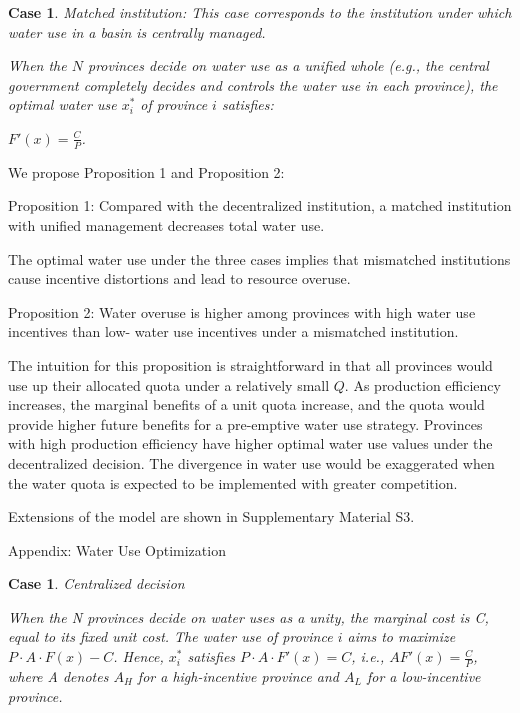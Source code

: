 \documentclass[default, sn-standardnature]{sn-jnl} %
\newtheorem{case}{Case}
\newtheorem{case_appendix}{Case}
\begin{document}
 \begin{case} Matched institution: This case corresponds to the institution under which water use in a basin is centrally managed.

 When the $N$ provinces decide on water use as a unified whole (e.g., the central government completely decides and controls the water use in each province), the optimal water use $x_i^*$ of province $i$ satisfies:

$F'(x)=\frac{C}{P}$.

 \end{case}


We propose Proposition 1 and Proposition 2:

Proposition 1: Compared with the decentralized institution, a matched institution with unified management decreases total water use.

The optimal water use under the three cases implies that mismatched institutions cause incentive distortions and lead to resource overuse.


Proposition 2: Water overuse is higher among provinces with high water use incentives than low- water use incentives under a mismatched institution.

The intuition for this proposition is straightforward in that all provinces would use up their allocated quota under a relatively small $Q$. As production efficiency increases, the marginal benefits of a unit quota increase, and the quota would provide higher future benefits for a pre-emptive water use strategy. Provinces with high production efficiency have higher optimal water use values under the decentralized decision. The divergence in water use would be exaggerated when the water quota is expected to be implemented with greater competition.


Extensions of the model are shown in Supplementary Material S3.%





Appendix: Water Use Optimization

\begin{case_appendix}Centralized decision

When the N provinces decide on water uses as a unity, the marginal cost is C, equal to its fixed unit cost.
The water use of province $i$ aims to maximize $P\cdot A\cdot F(x)-C$.
Hence, $x_i^*$ satisfies $P \cdot A\cdot F'(x)=C$, i.e., $AF'(x)=\frac{C}{P}$, where A denotes $A_H$ for a high-incentive province and $A_L$ for a low-incentive province.

\end{case_appendix}
\end{document}
